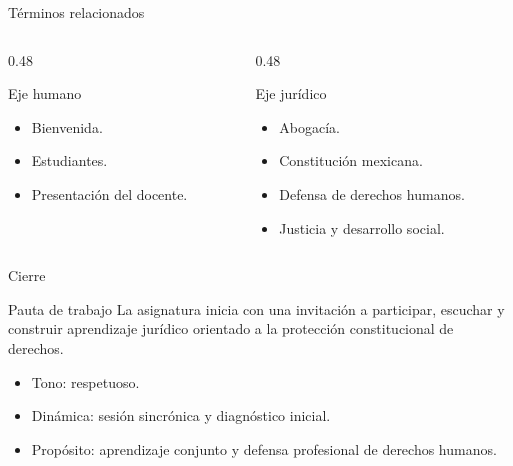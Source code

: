 \documentclass[
  spanish,
  aspectratio=169,
  xcolor={dvipsnames,table}
]{beamer}
\begin{document}
\begin{frame}{Términos relacionados}
  \begin{columns}[T]
    \begin{column}{0.48\linewidth}
      \begin{block}{Eje humano}
        \begin{itemize}
          \item Bienvenida.
          \item Estudiantes.
          \item Presentación del docente.
        \end{itemize}
      \end{block}
    \end{column}
    \begin{column}{0.48\linewidth}
      \begin{block}{Eje jurídico}
        \begin{itemize}
          \item Abogacía.
          \item Constitución mexicana.
          \item Defensa de derechos humanos.
          \item Justicia y desarrollo social.
        \end{itemize}
      \end{block}
    \end{column}
  \end{columns}
\end{frame}

\begin{frame}{Cierre}
  \begin{block}{Pauta de trabajo}
    La asignatura inicia con una invitación a participar, escuchar y construir aprendizaje jurídico orientado a la protección constitucional de derechos.
  \end{block}
  \begin{itemize}
    \item Tono: respetuoso.
    \item Dinámica: sesión sincrónica y diagnóstico inicial.
    \item Propósito: aprendizaje conjunto y defensa profesional de derechos humanos.
  \end{itemize}
\end{frame}
\end{document}
